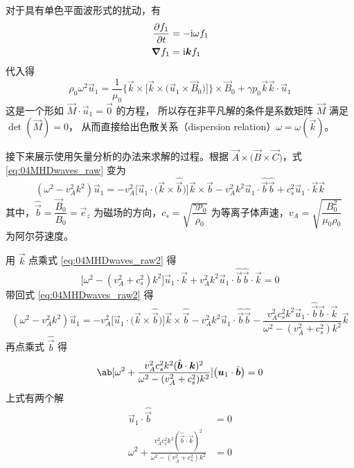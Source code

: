 对于具有单色平面波形式的扰动，有
\begin{subequations}\begin{align}
\pdv{f_1}{t} &= - \mathrm{i} \omega f_1 \\
\bm{\nabla}{f_1} &= \mathrm{i} \bm{k} f_1
\end{align}\end{subequations}
代入得
\begin{equation} \label{eq:04MHDwaves_raw}
\rho_0 \omega^2 \vec{u}_1
= \frac{1}{\mu_0} \bigg\{ \vec{k} \times \Big[ \vec{k} \times \big( \vec{u}_1 \times \vec{B}_0 \big) \Big] \bigg\} \times \vec{B}_0
+ \gamma p_0 \vec{k} \vec{k} \cdot \vec{u}_1
\end{equation}
这是一个形如 $ \vec{M} \cdot \vec{u}_1 = \vec{0} $ 的方程，
所以存在非平凡解的条件是系数矩阵 $\vec{M}$ 满足 $\det(\vec{M}) = 0$，
从而直接给出色散关系（dispersion relation）$\omega = \omega(\vec{k})$。

接下来展示使用矢量分析的办法来求解的过程。根据 $\vec{A} \times \big(\vec{B} \times \vec{C}\big)$，式 \ref{eq:04MHDwaves_raw} 变为
\begin{equation} \label{eq:04MHDwaves_raw2}
(\omega^2 - v_A^2 k^2) \vec{u}_1
= - v_A^2 \Big[ \vec{u}_1 \cdot \big(\vec{k} \times \hat{\vec{b}} \big) \Big] \vec{k} \times \hat{\vec{b}}
- v_A^2 k^2 \vec{u}_1 \cdot \hat{\vec{b}} \hat{\vec{b}}
+ c_s^2 \vec{u}_1 \cdot \vec{k} \vec{k}
\end{equation}
其中，$\hat{\vec{b}} = \dfrac{\vec{B}_0}{B_0} = \vec{e}_z$ 为磁场的方向，$c_s = \sqrt{\dfrac{\gamma p_0}{\rho_0}}$ 为等离子体声速，$v_A = \sqrt{\dfrac{B_0^2}{\mu_0 \rho_0}}$ 为阿尔芬速度。

用 $\vec{k}$ 点乘式 \ref{eq:04MHDwaves_raw2} 得
\begin{equation} \label{eq:04MHDwaves_k}
\big[\omega^2 - (v_A^2 + c_s^2) k^2 \big] \vec{u}_1 \cdot \vec{k}
+ v_A^2 k^2 \vec{u}_1 \cdot \hat{\vec{b}} \hat{\vec{b}} \cdot \vec{k} = 0
\end{equation}
带回式 \ref{eq:04MHDwaves_raw2} 得
\begin{equation}
(\omega^2 - v_A^2 k^2) \vec{u}_1
= - v_A^2 \Big[ \vec{u}_1 \cdot \big(\vec{k} \times \hat{\vec{b}} \big) \Big] \vec{k} \times \hat{\vec{b}}
- v_A^2 k^2 \vec{u}_1 \cdot \hat{\vec{b}} \hat{\vec{b}}
- \frac{v_A^2 c_s^2 k^2 \vec{u}_1 \cdot \hat{\vec{b}} \hat{\vec{b}} \cdot \vec{k}}{\omega^2 - (v_A^2 + c_s^2) k^2} \vec{k}
\end{equation}
再点乘式 $\hat{\vec{b}}$ 得
\begin{equation}
\ab[ \omega^2 + \frac{
    v_A^2 c_s^2 k^2 (\hat{\vec{b}} \cdot \vec{k})^2
}{\omega^2 - (v_A^2 + c_s^2) k^2} ] \big(\vec{u}_1 \cdot \hat{\vec{b}}\big) = 0
\end{equation}
上式有两个解
\begin{subequations}\begin{align}
\vec{u}_1 \cdot \hat{\vec{b}} &= 0
\label{eq:04MHDwaves_solution1}\\
\omega^2 + \frac{
    v_A^2 c_s^2 k^2 (\hat{\vec{b}} \cdot \vec{k})^2
}{\omega^2 - (v_A^2 + c_s^2) k^2} &= 0 \label{eq:04MHDwaves_solution2}
\end{align}\end{subequations}

